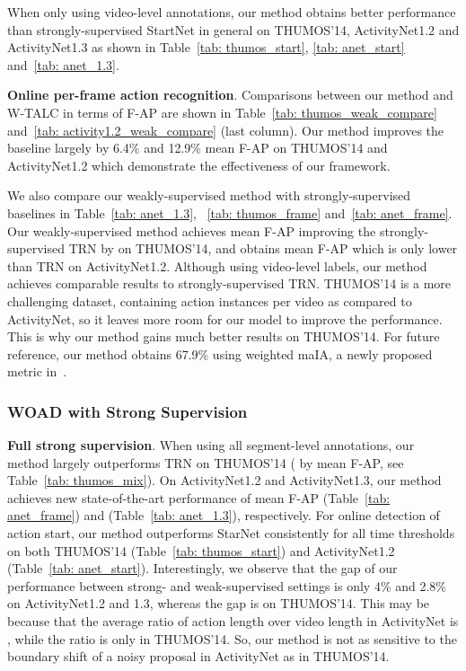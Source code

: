 \documentclass[final]{cvpr}
\begin{document}
When only using video-level annotations, our method obtains better performance than strongly-supervised StartNet in general on THUMOS'14, ActivityNet1.2 and ActivityNet1.3 as shown in Table~\ref{tab: thumos_start}, \ref{tab: anet_start} and~\ref{tab: anet_1.3}.

\textbf{Online per-frame action recognition}. Comparisons between our method and W-TALC in terms of F-AP are shown in Table~\ref{tab: thumos_weak_compare} and~\ref{tab: activity1.2_weak_compare} (last column). Our method improves the baseline largely by 6.4\% and 12.9\% mean F-AP on THUMOS'14 and ActivityNet1.2 which demonstrate the effectiveness of our framework.

We also compare our weakly-supervised method with strongly-supervised baselines in Table~\ref{tab: anet_1.3}, ~\ref{tab: thumos_frame} and~\ref{tab: anet_frame}. Our weakly-supervised method achieves  mean F-AP improving the strongly-supervised TRN by  on THUMOS'14, and obtains  mean F-AP which is only  lower than TRN on ActivityNet1.2. Although using video-level labels, our method achieves comparable results to strongly-supervised TRN. THUMOS'14 is a more challenging dataset, containing  action instances per video as compared to ActivityNet, so it leaves more room for our model to improve the performance. This is why our method gains much better results on THUMOS'14. For future reference, our method obtains 67.9\% using weighted maIA, a newly proposed metric in~\cite{baptista2019rethinking}.

\subsubsection{WOAD with Strong Supervision}
\textbf{Full strong supervision}. When using all segment-level annotations, our method largely outperforms TRN on THUMOS'14 ( by  mean F-AP, see Table~\ref{tab: thumos_mix}). On ActivityNet1.2 and ActivityNet1.3, our method achieves new state-of-the-art performance of  mean F-AP (Table~\ref{tab: anet_frame}) and  (Table~\ref{tab: anet_1.3}), respectively. For online detection of action start, our method outperforms StarNet consistently for all time thresholds on both THUMOS'14 (Table~\ref{tab: thumos_start}) and ActivityNet1.2 (Table~\ref{tab: anet_start}). Interestingly, we observe that the gap of our performance between strong- and weak-supervised settings is only 4\% and 2.8\% on ActivityNet1.2 and 1.3, whereas the gap is  on THUMOS'14. This may be because that the average ratio of action length over video length in ActivityNet is , while the ratio is only  in THUMOS'14. So, our method is not as sensitive to the boundary shift of a noisy proposal in ActivityNet as in THUMOS'14.
\end{document}
